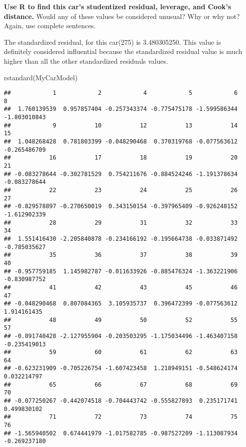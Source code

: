 \documentclass[
]{article}
\newenvironment{Shaded}{\begin{snugshade}}{\end{snugshade}}
\newcommand{\FunctionTok}[1]{\textcolor[rgb]{0.00,0.00,0.00}{#1}}
\newcommand{\NormalTok}[1]{#1}
\begin{document}
\textbf{Use R to find this car's studentized residual, leverage, and
Cook's distance.} Would any of these values be considered unusual? Why
or why not? Again, use complete sentences.

The standardized residual, for this car(275) is 3.480305250. This value
is definitely considered influential because the standardized residual
value is much higher than all the other standardized residuals values.

\begin{Shaded}
\begin{Highlighting}[]
\FunctionTok{rstandard}\NormalTok{(MyCarModel)}
\end{Highlighting}
\end{Shaded}

\begin{verbatim}
##            1            2            4            5            6            8 
##  1.760139539  0.957857404 -0.257343374 -0.775475178 -1.599586344 -1.803010843 
##            9           10           12           13           14           15 
##  1.048268428  0.781803399 -0.048290468  0.370319768 -0.077563612 -0.265486709 
##           16           17           18           19           20           21 
## -0.083278644 -0.302781529  0.754211676 -0.884524246 -1.191378634 -0.083278644 
##           22           23           24           25           26           27 
## -0.829578897 -0.270650019  0.343150154 -0.397965409 -0.926248152 -1.612902339 
##           28           29           31           32           33           34 
##  1.551416430 -2.205840878 -0.234166192 -0.195664738 -0.033871492 -0.785035627 
##           35           36           37           38           39           40 
## -0.957759185  1.145982787 -0.011633926 -0.885476324 -1.363221906 -0.830987752 
##           41           42           43           45           46           47 
## -0.048290468  0.807084365  3.105935737  0.396472399 -0.077563612  1.914161435 
##           48           49           50           52           55           57 
## -0.891740428 -2.127955904 -0.203503295 -1.175034496 -1.463407158 -0.235419013 
##           59           60           61           62           63           64 
## -0.623231909 -0.705226754 -1.607423458  1.218949151 -0.548624174  0.032214797 
##           65           66           67           68           69           70 
## -0.077250267 -0.442074518 -0.704443742 -0.555827893  0.235171741  0.499830102 
##           71           72           73           74           75           76 
## -1.565940502  0.674441979 -1.017582785 -0.987527209 -1.113087934 -0.269237180 

\end{verbatim}
\end{document}
